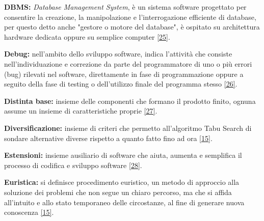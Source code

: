 \begin{description}
     \item \label{DBMS} \textbf{DBMS:} \textit{Database Management System}, è un sistema software progettato per consentire la creazione, la manipolazione e l'interrogazione efficiente di database, 
    per questo detto anche "gestore o motore del database", è ospitato su architettura hardware dedicata oppure su semplice computer \hyperref[dbms]{[25]}.
    
    \item \label{Debug} \textbf{Debug:} nell'ambito dello sviluppo software, indica l'attività che consiste nell'individuazione e correzione da parte del programmatore di uno o più errori (bug) rilevati
     nel software, direttamente in fase di programmazione oppure a seguito della fase di testing o dell'utilizzo finale del programma stesso \hyperref[debug]{[26]}.
    
     \item \label{Distinta base} \textbf{Distinta base:} insieme delle componenti che formano il prodotto finito, ognuna assume un insieme di caratteristiche proprie \hyperref[distinta-base]{[27]}.
    
     \item \label{Diversificazione} \textbf{Diversificazione:} insieme di criteri che permetto all'algoritmo Tabu Search di sondare alternative diverse rispetto a quanto fatto fino ad ora \hyperref[slide]{[15]}.
    
     \item \label{Estensioni} \textbf{Estensioni:} insieme ausiliario di software che aiuta, aumenta e semplifica il processo di codifica e sviluppo software \hyperref[estensione]{[28]}.
    
     \item \label{Euristica} \textbf{Euristica:} si definisce procedimento euristico, un metodo di approccio alla soluzione dei problemi che non segue un chiaro percorso,
     ma che si affida all'intuito e allo stato temporaneo delle circostanze, al fine di generare nuova conoscenza \hyperref[slide]{[15]}.


\end{description}
